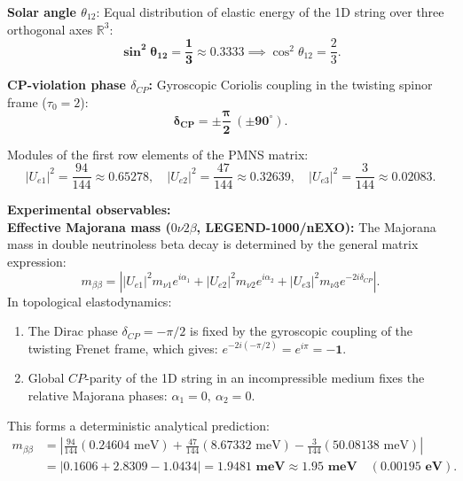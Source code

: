 \documentclass[12pt,a4paper]{article}
\begin{document}
	\textbf{Solar angle $\theta_{12}$}: Equal distribution of elastic energy of the 1D string over three orthogonal axes $\mathbb{R}^3$:
	\begin{equation}
	\mathbf{\sin^2\theta_{12} = \frac{1}{3} \approx 0.3333} \implies \cos^2\theta_{12} = \frac{2}{3}.
	\end{equation}
				
	\textbf{CP-violation phase $\delta_{CP}$:} Gyroscopic Coriolis coupling in the twisting spinor frame ($\tau_0 = 2$):
	\begin{equation}
	\mathbf{\delta_{CP} = \pm \frac{\pi}{2} \ (\pm 90^\circ)}.
	\end{equation}
				
	Modules of the first row elements of the PMNS matrix:
	\begin{equation}
	|U_{e1}|^2 = \frac{94}{144} \approx 0.65278, \quad |U_{e2}|^2 = \frac{47}{144} \approx 0.32639, \quad |U_{e3}|^2 = \frac{3}{144} \approx 0.02083.
	\end{equation}
				
	\textbf{Experimental observables:\\ Effective Majorana mass ($0\nu 2\beta$, LEGEND-1000/nEXO):}
	The Majorana mass in double neutrinoless beta decay is determined by the general matrix expression:
	\begin{equation}
	m_{\beta\beta} = \left| |U_{e1}|^2 m_{\nu 1} e^{i\alpha_1} + |U_{e2}|^2 m_{\nu 2} e^{i\alpha_2} + |U_{e3}|^2 m_{\nu 3} e^{-2i\delta_{CP}} \right|.
	\end{equation}
	In topological elastodynamics:
	\begin{enumerate}
	\item The Dirac phase $\delta_{CP} = -\pi/2$ is fixed by the gyroscopic coupling of the twisting Frenet frame, which gives: $e^{-2i(-\pi/2)} = e^{i\pi} = \mathbf{-1}$.
	\item Global $CP$-parity of the 1D string in an incompressible medium fixes the relative Majorana phases: $\alpha_1 = 0, \ \alpha_2 = 0$.
	\end{enumerate}
	This forms a deterministic analytical prediction:
	\begin{align}
	m_{\beta\beta} &= \left| \frac{94}{144}(0.24604 \text{ meV}) + \frac{47}{144}(8.67332 \text{ meV}) - \frac{3}{144}(50.08138 \text{ meV}) \right| \nonumber \\
	&= |0.1606 + 2.8309 - 1.0434| = \mathbf{1.9481 \text{ meV}} \approx \mathbf{1.95 \text{ meV}} \quad (\mathbf{0.00195 \text{ eV}}).
	\end{align}
				
\end{document}
